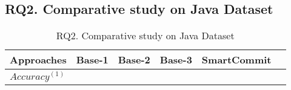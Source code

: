 \subsection{{\bf RQ2. Comparative study on Java Dataset}}

\begin{table}[t]
	\caption{RQ2. Comparative study on Java Dataset}
	\vspace{-0.1in}
	\begin{center}
		\footnotesize
		\tabcolsep 4pt
		\renewcommand{\arraystretch}{1} \begin{tabular}{p{1.4cm}<{\centering}|p{0.7cm}<{\centering}p{0.7cm}<{\centering}p{0.7cm}<{\centering}p{1.5cm}<{\centering}|p{0.7cm}<{\centering}}
			
			\hline
			Approaches          & Base-1 & Base-2 & Base-3 & SmartCommit & \tool\\
			\hline
			$Accuracy^{(1)}$   &                &			 	&				   &		&      \\
			\hline
		\end{tabular}
		\label{RQ2-result}
	\end{center}
\end{table}